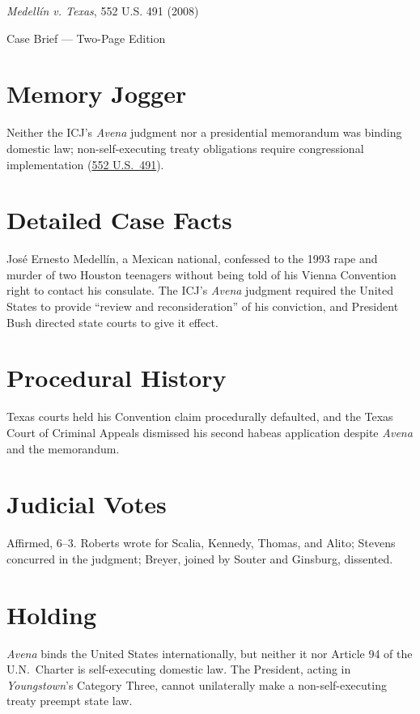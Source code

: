 \documentclass[12pt]{article}
\begin{document}
\begin{center}
{\LARGE \textit{Medell\'{i}n v. Texas}, 552 U.S. 491 (2008)\par}
\vspace{0.5em}
{\large Case Brief --- Two-Page Edition\par}
\end{center}

\section{Memory Jogger}
Neither the ICJ's \textit{Avena} judgment nor a presidential memorandum was binding domestic law; non-self-executing treaty obligations require congressional implementation (\href{https://supreme.justia.com/cases/federal/us/552/491/}{552 U.S.\ 491}).

\section{Detailed Case Facts}
Jos\'{e} Ernesto Medell\'{i}n, a Mexican national, confessed to the 1993 rape and murder of two Houston teenagers without being told of his Vienna Convention right to contact his consulate. The ICJ's \textit{Avena} judgment required the United States to provide ``review and reconsideration'' of his conviction, and President Bush directed state courts to give it effect.

\section{Procedural History}
Texas courts held his Convention claim procedurally defaulted, and the Texas Court of Criminal Appeals dismissed his second habeas application despite \textit{Avena} and the memorandum.

\section{Judicial Votes}
Affirmed, 6--3. Roberts wrote for Scalia, Kennedy, Thomas, and Alito; Stevens concurred in the judgment; Breyer, joined by Souter and Ginsburg, dissented.

\section{Holding}
\textit{Avena} binds the United States internationally, but neither it nor Article 94 of the U.N.\ Charter is self-executing domestic law. The President, acting in \textit{Youngstown}'s Category Three, cannot unilaterally make a non-self-executing treaty preempt state law.
\end{document}

